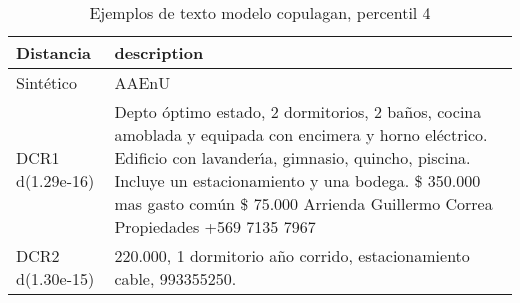 \begin{table}[H]
\centering
\fontsize{10}{14}\selectfont
\caption{Ejemplos de texto modelo copulagan, percentil 4}
\label{table-example-economicos-b-1-copulagan-4p-text}
\begin{tabular}{|l|m{35em}|}
\hline
\rowcolor[gray]{0.8}
Distancia & description \\
\hline Sintético & AAEnU \\
\hline DCR1 d(1.29e-16) & Depto \'optimo estado, 2 dormitorios, 2 ba\~nos, cocina amoblada y equipada con encimera y horno el\'ectrico. Edificio con lavander{\'\i}a, gimnasio, quincho, piscina. Incluye un estacionamiento y una bodega.
\$ 350.000 mas gasto com\'un \$ 75.000
Arrienda Guillermo Correa Propiedades
+569 7135 7967
  \\
\hline DCR2 d(1.30e-15) & 220.000, 1 dormitorio a\~no corrido, estacionamiento cable, 993355250. \\
\hline
\end{tabular}
\end{table}
